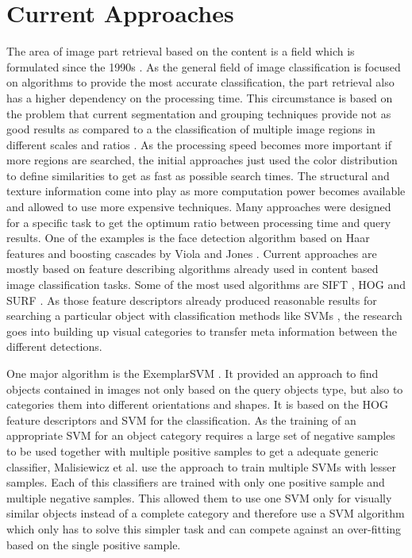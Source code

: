 \chapter{Current Approaches}

The area of image part retrieval based on the content is a field which is formulated since the 1990s \cite{eakins1999content} \cite{rui1997content} \cite{osuna1997training}. As the general field of image classification is focused on algorithms to provide the most accurate classification, the part retrieval also has a higher dependency on the processing time. This circumstance is based on the problem that current segmentation and grouping techniques provide not as good results as compared to a the classification of multiple image regions in different scales and ratios \cite{book:848523}. As the processing speed becomes more important if more regions are searched, the initial approaches just used the color distribution to define similarities to get as fast as possible search times. The structural and texture information come into play as more computation power becomes available and allowed to use more expensive techniques. Many approaches were designed for a specific task to get the optimum ratio between processing time and query results. One of the examples is the face detection algorithm based on Haar features and boosting cascades by Viola and Jones \cite{viola2001rapid}. Current approaches are mostly based on feature describing algorithms already used in content based image classification tasks. Some of the most used algorithms are \acf{SIFT} \cite{Lowe2004}, \acf{HOG} \cite{Dalal2005} and \acf{SURF} \cite{bay2008speeded}. As those feature descriptors already produced reasonable results for searching a particular object with classification methods like \aclp{SVM} \cite{cortes1995support}, the research goes into building up visual categories to transfer meta information between the different detections.

One major algorithm is the ExemplarSVM \cite{Malisiewicz2011}. It provided an approach to find objects contained in images not only based on the query objects type, but also to categories them into different orientations and shapes.
It is based on the \ac{HOG} feature descriptors and \ac{SVM} for the classification. As the training of an appropriate \ac{SVM} for an object category requires a large set of negative samples to be used together with multiple positive samples to get a adequate generic classifier, Malisiewicz et al. use the approach to train multiple \acp{SVM} with lesser samples. Each of this classifiers are trained with only one positive sample and multiple negative samples. This allowed them to use one \ac{SVM} only for visually similar objects instead of a complete category and therefore use a \ac{SVM} algorithm which only has to solve this simpler task and can compete against an over-fitting based on the single positive sample.

